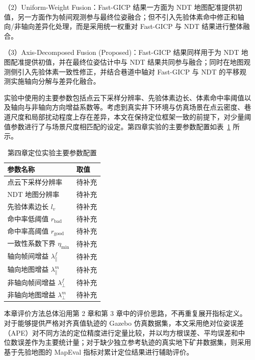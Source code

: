 （2）Uniform-Weight Fusion：Fast-GICP 结果一方面为 NDT 地图配准提供初值，另一方面作为帧间观测参与最终位姿融合；但不引入先验体素命中修正和轴向/非轴向差异化处理，而是采用统一权重对 Fast-GICP 与 NDT 结果进行整体融合。

（3）Axis-Decomposed Fusion (Proposed)：Fast-GICP 结果同样用于为 NDT 地图配准提供初值，并在最终位姿估计中与 NDT 结果共同参与融合；同时在地图观测侧引入先验体素一致性修正，并结合巷道中轴对 Fast-GICP 与 NDT 的平移观测实施轴向分解与差异化融合。

实验中使用的主要参数包括点云下采样分辨率、先验体素边长、体素命中率阈值以及轴向与非轴向方向增益系数等。考虑到真实井下环境与仿真场景在点云密度、巷道尺度和局部扰动程度上存在差异，本文在保持定位框架一致的前提下，对少量阈值参数进行了与场景尺度相匹配的设定。第四章实验的主要参数配置如表~\ref{tab:ch4_exp_params} 所示。

\begin{table}[htbp]
    \centering
    \caption{第四章定位实验主要参数配置}
    \label{tab:ch4_exp_params}
    \small
    \renewcommand{\arraystretch}{1.15}
    \begin{tabular}{p{6.2cm}p{4.0cm}}
        \toprule
        参数名称 & 取值 \\
        \midrule
        点云下采样分辨率 & 待补充 \\
        NDT 地图分辨率 & 待补充 \\
        先验体素边长 $l_v$ & 待补充 \\
        命中率低阈值 $r_{\mathrm{bad}}$ & 待补充 \\
        命中率高阈值 $r_{\mathrm{good}}$ & 待补充 \\
        一致性系数下界 $\eta_{\min}$ & 待补充 \\
        轴向帧间增益 $\lambda_{\parallel}^{f}$ & 待补充 \\
        轴向地图增益 $\lambda_{\parallel}^{m}$ & 待补充 \\
        非轴向帧间增益 $\lambda_{\perp}^{f}$ & 待补充 \\
        非轴向地图增益 $\lambda_{\perp}^{m}$ & 待补充 \\
        \bottomrule
    \end{tabular}
\end{table}

本章评价方法总体沿用第 2 章和第 3 章中的评价思路，不再重复展开指标定义。对于能够提供严格对齐真值轨迹的 Gazebo 仿真数据集，本文采用绝对位姿误差（APE）对不同方法的定位精度进行定量比较，并以均方根误差、平均误差和中位数误差作为主要统计量；对于缺少独立参考轨迹的真实地下矿井数据集，则采用基于先验地图的 MapEval 指标对累计定位结果进行辅助评价。

